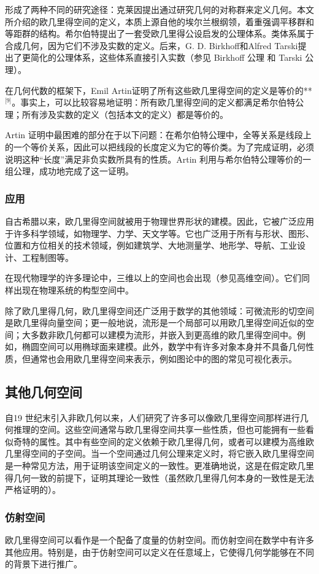 形成了两种不同的研究途径：克莱因提出通过研究几何的对称群来定义几何。本文所介绍的欧几里得空间的定义，本质上源自他的埃尔兰根纲领，着重强调平移群和等距群的结构。希尔伯特提出了一套受欧几里得公设启发的公理体系。类体系属于合成几何，因为它们不涉及实数的定义。后来，G. D. Birkhoff和Alfred Tarski提出了更简化的公理体系，这些体系直接引入实数（参见 Birkhoff 公理 和 Tarski 公理）。

在几何代数的框架下，Emil Artin证明了所有这些欧几里得空间的定义是等价的**\(^\text{[9]}\)。事实上，可以比较容易地证明：所有欧几里得空间的定义都满足希尔伯特公理；所有涉及实数的定义（包括本文的定义）都是等价的。

Artin 证明中最困难的部分在于以下问题：在希尔伯特公理中，全等关系是线段上的一个等价关系，因此可以把线段的长度定义为它的等价类。为了完成证明，必须说明这种“长度”满足非负实数所具有的性质。Artin 利用与希尔伯特公理等价的一组公理，成功地完成了这一证明。
\subsubsection{应用}
自古希腊以来，欧几里得空间就被用于物理世界形状的建模。因此，它被广泛应用于许多科学领域，如物理学、力学、天文学等。它也广泛用于所有与形状、图形、位置和方位相关的技术领域，例如建筑学、大地测量学、地形学、导航、工业设计、工程制图等。

在现代物理学的许多理论中，三维以上的空间也会出现（参见高维空间）。它们同样出现在物理系统的构型空间中。

除了欧几里得几何，欧几里得空间还广泛用于数学的其他领域：可微流形的切空间是欧几里得向量空间；更一般地说，流形是一个局部可以用欧几里得空间近似的空间；大多数非欧几何都可以建模为流形，并嵌入到更高维的欧几里得空间中。例如，椭圆空间可以用椭球面来建模。此外，数学中有许多对象本身并不具备几何性质，但通常也会用欧几里得空间来表示，例如图论中的图的常见可视化表示。
\subsection{其他几何空间}
自19 世纪末引入非欧几何以来，人们研究了许多可以像欧几里得空间那样进行几何推理的空间。这些空间通常与欧几里得空间共享一些性质，但也可能拥有一些看似奇特的属性。其中有些空间的定义依赖于欧几里得几何，或者可以建模为高维欧几里得空间的子空间。当一个空间通过几何公理来定义时，将它嵌入欧几里得空间是一种常见方法，用于证明该空间定义的一致性。更准确地说，这是在假定欧几里得几何一致的前提下，证明其理论一致性（虽然欧几里得几何本身的一致性是无法严格证明的）。
\subsubsection{仿射空间}
欧几里得空间可以看作是一个配备了度量的仿射空间。而仿射空间在数学中有许多其他应用。特别是，由于仿射空间可以定义在任意域上，它使得几何学能够在不同的背景下进行推广。

